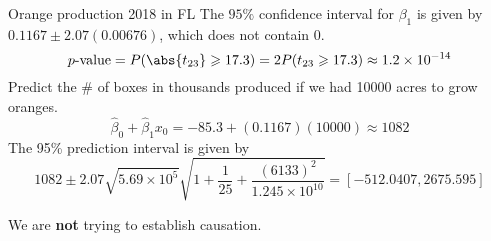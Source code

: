 \begin{Example}{Orange production 2018 in FL}{}
  The $ 95\% $ confidence interval for $ \beta_1 $ is given by
  $ 0.1167\pm 2.07(0.00676) $,
  which does not contain $ 0 $.
  \[ p\text{-value}=P(\abs{t_{23}}\geqslant 17.3)=
    2P(t_{23}\geqslant 17.3)\approx 1.2\times 10^{-14} \]
  Predict the \# of boxes in thousands produced if we had
  10000 acres to grow oranges.
  \[ \hat{\beta}_0+\hat{\beta}_1x_0=-85.3+(0.1167)(10000)\approx 1082 \]
  The 95\% prediction interval is given by
  \[ 1082\pm 2.07\sqrt{5.69\times 10^5}\sqrt{1+\frac{1}{25}+
    \frac{(6133)^2}{1.245\times 10^{10}} }=
      [-512.0407, 2675.595] \]
  \begin{Remark}{}{}
    We are \textbf{not} trying to establish causation.
  \end{Remark}
\end{Example}
